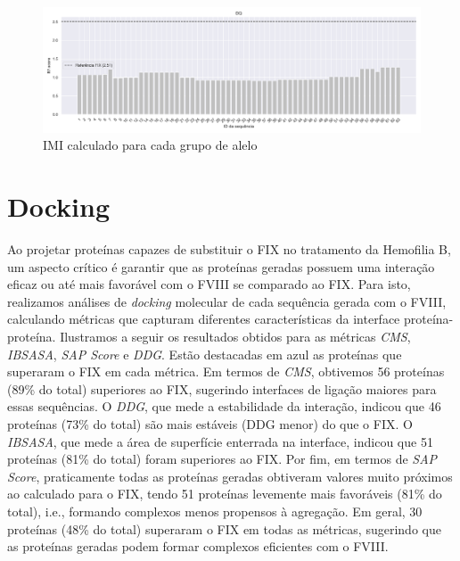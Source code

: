 \begin{figure}[H]
\begin{minipage}{0.9\textwidth}
    \end{minipage} \\[1ex]%
    \begin{minipage}{0.9\textwidth}
        \centering
        \includegraphics[width=\textwidth]{figuras/plot_imuno_IMscore_DQ.png}
    \end{minipage} 
    \caption{IMI calculado para cada grupo de alelo}
\end{figure}


\section{Docking}       

Ao projetar proteínas capazes de substituir o FIX no tratamento da Hemofilia B, um aspecto crítico é garantir que as 
proteínas geradas possuem uma interação eficaz ou até mais favorável com o FVIII se comparado ao FIX.
Para isto, realizamos análises de \textit{docking} molecular de cada sequência gerada com o FVIII,
calculando métricas que capturam diferentes características da interface proteína-proteína. 
Ilustramos a seguir os resultados obtidos para as métricas \textit{CMS}, \textit{IBSASA}, \textit{SAP Score} e \textit{DDG}.
Estão destacadas em azul as proteínas que superaram o FIX em cada métrica.
Em termos de \textit{CMS}, obtivemos 56 proteínas (89\% do total) superiores ao FIX, 
sugerindo interfaces de ligação maiores para essas sequências.
O \textit{DDG}, que mede a estabilidade da interação, indicou que 46 proteínas (73\% do total) 
são mais estáveis (DDG menor) do que o FIX.
O \textit{IBSASA}, que mede a área de superfície enterrada na interface, indicou que 51 proteínas (81\% do total)
foram superiores ao FIX.
Por fim, em termos de \textit{SAP Score}, praticamente todas as proteínas geradas obtiveram valores muito próximos ao 
calculado para o FIX, tendo 51 proteínas levemente mais favoráveis (81\% do total), i.e., formando complexos menos propensos à agregação.
Em geral, 30 proteínas (48\% do total) superaram o FIX em todas as métricas,
sugerindo que as proteínas geradas podem formar complexos eficientes com o FVIII.

